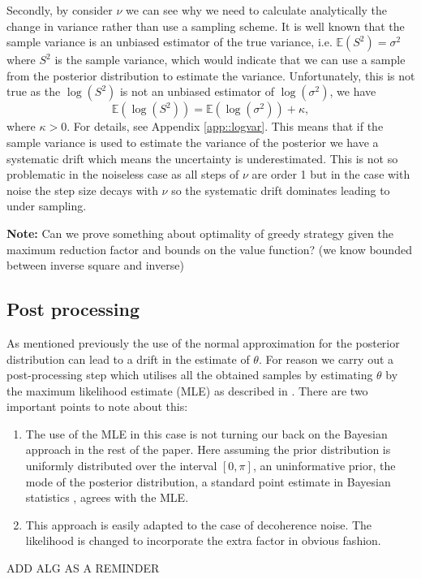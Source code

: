 Secondly, by consider $\nu$ we can see why we need to calculate analytically the change in variance rather than use a sampling scheme. It is well known that the sample variance is an unbiased estimator of the true variance, i.e. $\mathbb{E}(S^2)=\sigma^2$ where $S^2$ is the sample variance, which would indicate that we can use a sample from the posterior distribution to estimate the variance. Unfortunately, this is not true as the $\log(S^2)$ is not an unbiased estimator of $\log(\sigma^2)$, we have $$ \mathbb{E}(\log(S^2)) = \mathbb{E}(\log(\sigma^2)) +\kappa, $$ where $\kappa>0$. For details, see Appendix \ref{app::logvar}. This means that if the sample variance is used to estimate the variance of the posterior we have a systematic drift which means the uncertainty is underestimated. This is not so problematic in the noiseless case as all steps of $\nu$ are order 1 but in the case with noise the step size decays with $\nu$ so the systematic drift dominates leading to under sampling.



{\color{red} {\bf Note:} Can we prove something about optimality of greedy strategy given the maximum reduction factor and bounds on the value function? (we know bounded between inverse square and inverse)}



\subsection{Post processing}\label{sec::post}
As mentioned previously the use of the normal approximation for the posterior distribution can lead to a drift in the estimate of $\theta$. For reason we carry out a post-processing step which utilises all the obtained samples by estimating $\theta$ by the maximum likelihood estimate (MLE) as described in \cite{}. There are two important points to note about this:
\begin{enumerate}\item The use of the MLE in this case is not turning our back on the Bayesian approach in the rest of the paper. Here assuming the prior distribution is uniformly distributed over the interval $[0,\pi]$, an uninformative prior,  the mode of the posterior distribution, a standard point estimate in Bayesian statistics \cite{}, agrees with the MLE.
\item This approach is easily adapted to the case of decoherence noise. The likelihood is changed to incorporate the extra factor in obvious fashion.
\end{enumerate}

ADD ALG AS A REMINDER

\newpage
